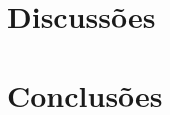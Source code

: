 \documentclass[smallextended]{svjour3}       %
\begin{document}

\section{Discussões}



\section{Conclusões}
\label{conclusions}




\end{document}
